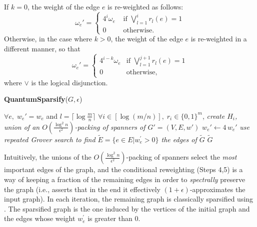 If $k=0$, the weight of the edge $e$ is re-weighted as follows:
\begin{equation*}
    \omega_e' =
    \begin{cases}
    4^i\omega_e & \text{ if } \bigvee\limits_{l=1}^i r_l(e) = 1 \\
    0 & \text{ otherwise.}
    \end{cases}
\end{equation*}
Otherwise, in the case where $k>0$, the weight of the edge $e$ is re-weighted 
in a different manner, so that
\begin{equation*}
    \omega_e' =
    \begin{cases}
    4^{i-k}\omega_e & \text{if } \bigvee\limits_{l=1}^{j+1} r_l(e) = 1 \\
    0 & \text{otherwise,}
    \end{cases}
\end{equation*}
where $\vee$ is the logical disjunction.


\begin{algorithm}[H]
    \caption{\textbf{QuantumSparsify}($G,\epsilon$)}\label{alg:quantum-sparsify}
    \begin{algorithmic}[1]
    \Require $\forall e, \; w_e' = w_e$ and $l=\lceil \log\frac mn \rceil$
    \Require $\forall i\in[\log(m/n)], \; r_i \in \{0,1\}^m$, 
    \State \textit{create $H_i$, union of an $O(\frac{\log^2 n}{\epsilon ^2})$-packing of
    spanners of $G' = (V,E,w')$}  
      $w_e' \leftarrow 4\,w_e'$ 
    \EndIf
    \EndFor \EndFor 
    \State \textit{use repeated Grover search to find $\tilde{E} = \{ e \in E | w_e^{'} > 0\}$ the edges of $\tilde{G}$ }
    \State \Return $\tilde{G}$
    \end{algorithmic}
\end{algorithm}

Intuitively, the unions of the $O(\frac{\log^2 n}{\epsilon ^2})$-packing of spanners select the \textit{most} important edges of the graph, and the conditional reweighting (Steps 4,5) is a way of keeping a fraction of the remaining edges in order to \textit{spectrally} preserve the graph (i.e., asserts that in the end it effectively $(1+\epsilon)$-approximates the input graph). In each iteration, the remaining graph is classically sparsified using
. The sparsified graph is the one induced by the vertices 
of the initial graph and the edges whose weight $w_e^{'}$ is greater than $0$. 

